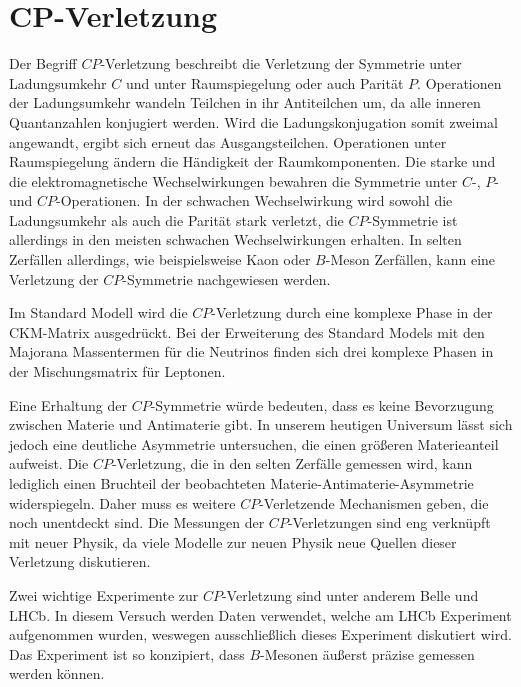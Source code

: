 \section{CP-Verletzung}

Der Begriff $CP$-Verletzung beschreibt die Verletzung der Symmetrie unter Ladungsumkehr $C$ und unter
Raumspiegelung oder auch Parität $P$. Operationen der Ladungsumkehr wandeln Teilchen in ihr
Antiteilchen um, da alle inneren Quantanzahlen konjugiert werden. Wird die Ladungskonjugation somit
zweimal angewandt, ergibt sich erneut das Ausgangsteilchen. Operationen unter Raumspiegelung ändern
die Händigkeit der Raumkomponenten. Die starke und die elektromagnetische Wechselwirkungen bewahren
die Symmetrie unter $C$-, $P$- und $CP$-Operationen. In der schwachen Wechselwirkung wird sowohl die
Ladungsumkehr als auch die Parität stark verletzt, die $CP$-Symmetrie ist allerdings in den meisten
schwachen Wechselwirkungen erhalten. In selten Zerfällen allerdings, wie beispielsweise Kaon
oder $B$-Meson Zerfällen, kann eine Verletzung der $CP$-Symmetrie nachgewiesen werden.  \par

Im Standard Modell wird die $CP$-Verletzung durch eine komplexe Phase in der CKM-Matrix
ausgedrückt. Bei der Erweiterung des Standard Models mit den Majorana Massentermen für die
Neutrinos finden sich drei komplexe Phasen in der Mischungsmatrix für Leptonen. \par

Eine Erhaltung der $CP$-Symmetrie würde bedeuten, dass es keine Bevorzugung zwischen Materie und
Antimaterie gibt. In unserem heutigen Universum lässt sich jedoch eine deutliche Asymmetrie
untersuchen, die einen größeren Materieanteil aufweist.
Die $CP$-Verletzung, die in den selten Zerfälle gemessen wird, kann lediglich einen Bruchteil der beobachteten Materie-Antimaterie-Asymmetrie widerspiegeln.
Daher muss es weitere $CP$-Verletzende Mechanismen geben, die noch unentdeckt sind. Die
Messungen der $CP$-Verletzungen sind eng verknüpft mit neuer Physik, da viele Modelle zur neuen
Physik neue Quellen dieser Verletzung diskutieren. \par

Zwei wichtige Experimente zur $CP$-Verletzung sind unter anderem Belle und LHCb. In diesem
Versuch werden Daten verwendet, welche am LHCb Experiment aufgenommen wurden, weswegen
ausschließlich dieses Experiment diskutiert wird. Das Experiment ist so konzipiert, dass
$B$-Mesonen äußerst präzise gemessen werden können. \par


